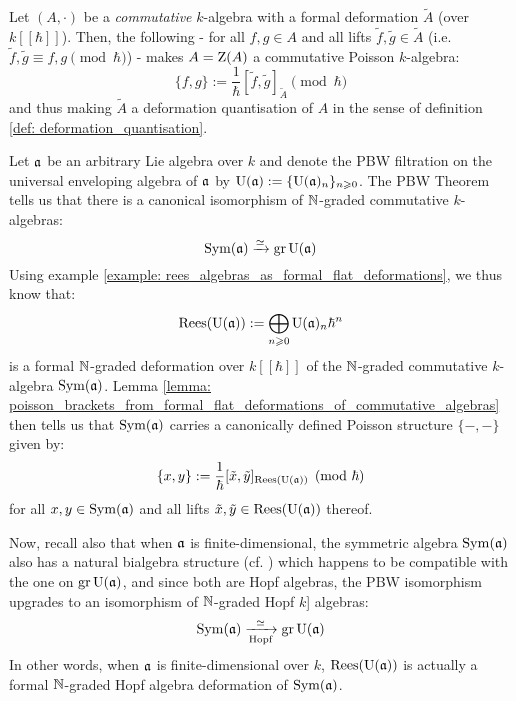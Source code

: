         \begin{corollary} \label{coro: deformation_quantisation_of_poisson_algebras_from_formal_flat_deformations}
            Let $(A, \cdot)$ be a \textit{commutative} $k$-algebra with a formal deformation $\tilde{A}$ (over $k[\![\hbar]\!]$). Then, the following - for all $f, g \in A$ and all lifts $\tilde{f}, \tilde{g} \in \tilde{A}$ (i.e. $\tilde{f}, \tilde{g} \equiv f, g \pmod{\hbar}$) - makes $A = \mathrm{Z}(A)$ a commutative Poisson $k$-algebra:
                $$\{f, g\} := \frac{1}{\hbar}[\tilde{f}, \tilde{g}]_{\tilde{A}} \pmod{\hbar}$$
            and thus making $\tilde{A}$ a deformation quantisation of $A$ in the sense of definition \ref{def: deformation_quantisation}.
        \end{corollary}
        \begin{example} \label{example: PBW_deformations}
            Let $\mathfrak{a}$ be an arbitrary Lie algebra over $k$ and denote the PBW filtration on the universal enveloping algebra of $\mathfrak{a}$ by $\mathrm{U}(\mathfrak{a}) := \{\mathrm{U}(\mathfrak{a})_n\}_{n \geqslant 0}$. The PBW Theorem tells us that there is a canonical isomorphism of $\mathbb{N}$-graded commutative $k$-algebras:
                $$\mathrm{Sym}(\mathfrak{a}) \xrightarrow[]{\simeq} \operatorname{gr} \mathrm{U}(\mathfrak{a})$$
            Using example \ref{example: rees_algebras_as_formal_flat_deformations}, we thus know that:
                $$\operatorname{Rees}(\mathrm{U}(\mathfrak{a})) := \bigoplus_{n \geqslant 0} \mathrm{U}(\mathfrak{a})_n \hbar^n$$
            is a formal $\mathbb{N}$-graded deformation over $k[\![\hbar]\!]$ of the $\mathbb{N}$-graded commutative $k$-algebra $\mathrm{Sym}(\mathfrak{a})$. Lemma \ref{lemma: poisson_brackets_from_formal_flat_deformations_of_commutative_algebras} then tells us that $\mathrm{Sym}(\mathfrak{a})$ carries a canonically defined Poisson structure $\{-, -\}$ given by:
                $$\{x, y\} := \frac{1}{\hbar}[\tilde{x}, \tilde{y}]_{\operatorname{Rees}(\mathrm{U}(\mathfrak{a}))} \pmod{\hbar}$$
            for all $x, y \in \mathrm{Sym}(\mathfrak{a})$ and all lifts $\tilde{x}, \tilde{y} \in \operatorname{Rees}(\mathrm{U}(\mathfrak{a}))$ thereof. 

            Now, recall also that when $\mathfrak{a}$ is finite-dimensional, the symmetric algebra $\mathrm{Sym}(\mathfrak{a})$ also has a natural bialgebra structure (cf. \cite[Chapter III]{kassel_quantum_groups}) which happens to be compatible with the one on $\operatorname{gr} \mathrm{U}(\mathfrak{a})$, and since both are Hopf algebras, the PBW isomorphism upgrades to an isomorphism of $\mathbb{N}$-graded Hopf $k$]
            algebras:
                $$\mathrm{Sym}(\mathfrak{a}) \xrightarrow[\text{Hopf}]{\simeq} \operatorname{gr} \mathrm{U}(\mathfrak{a})$$
            In other words, when $\mathfrak{a}$ is finite-dimensional over $k$, $\operatorname{Rees}(\mathrm{U}(\mathfrak{a}))$ is actually a formal $\mathbb{N}$-graded Hopf algebra deformation of $\mathrm{Sym}(\mathfrak{a})$. 
        \end{example}
    
